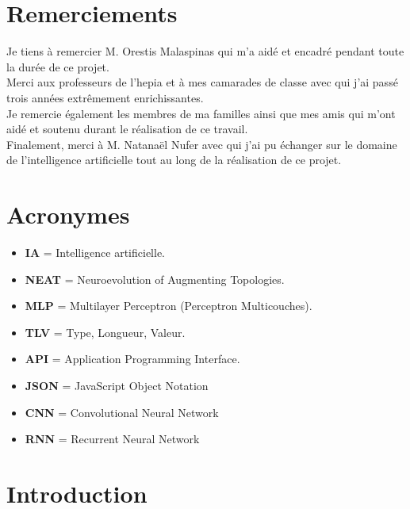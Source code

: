 \documentclass{article}
\begin{document}




\section*{Remerciements}

Je tiens à remercier M. Orestis Malaspinas qui m'a aidé et encadré pendant toute la durée de ce projet.\\

Merci aux professeurs de l'hepia et à mes camarades de classe avec qui j'ai passé trois années extrêmement enrichissantes.\\

Je remercie également les membres de ma familles ainsi que mes amis qui m'ont aidé et soutenu durant le réalisation de ce travail.\\

Finalement, merci à M. Natanaël Nufer avec qui j'ai pu échanger sur le domaine de l'intelligence artificielle tout au long de la réalisation de ce projet.
\newpage
\section*{Acronymes}
\begin{itemize}
	\item \textbf{IA} = Intelligence artificielle.
	\item \textbf{NEAT} = Neuroevolution of Augmenting Topologies.
	\item \textbf{MLP} = Multilayer Perceptron (Perceptron Multicouches).
	\item \textbf{TLV} = Type, Longueur, Valeur.
	\item \textbf{API} = Application Programming Interface.
	\item \textbf{JSON} = JavaScript Object Notation
	\item \textbf{CNN} = Convolutional Neural Network
	\item \textbf{RNN} = Recurrent Neural Network
\end{itemize}

\newpage
\tableofcontents

\newpage

\listoffigures

\newpage

\section{Introduction}
\end{document}
